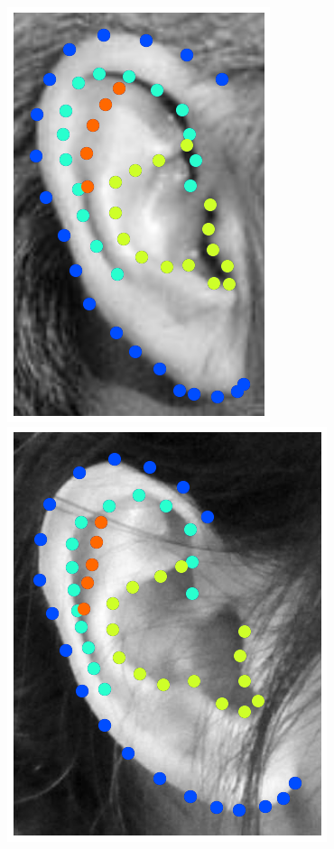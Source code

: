\begin{figure}
    \includegraphics[height=\flowhhh]{resources/Ear_Deformable_Model/dbs/db_10}
    \hfill
    \includegraphics[height=\flowhhh]{resources/Ear_Deformable_Model/dbs/db_11}
    \hfill

\end{figure}
